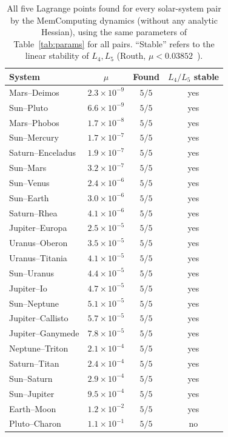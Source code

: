 \documentclass[aip,preprint,amsmath,amssymb,floatfix]{revtex4-2}
\begin{document}
\begin{table}[t]
\centering
\caption{All five Lagrange points found for every solar-system pair by the
MemComputing dynamics (without any analytic Hessian), using the same 
parameters of Table~\ref{tab:params} for all pairs. ``Stable'' refers to the linear stability
of $L_4,L_5$ (Routh, $\mu<0.03852$~\cite{routh1875}).}
\label{tab:systems}
\begin{tabular}{lccc}
\toprule
System & $\mu$ & Found & $L_4/L_5$ stable\\
\midrule
Mars--Deimos      & $2.3\times10^{-9}$ & $5/5$ & yes\\
Sun--Pluto        & $6.6\times10^{-9}$ & $5/5$ & yes\\
Mars--Phobos      & $1.7\times10^{-8}$ & $5/5$ & yes\\
Sun--Mercury      & $1.7\times10^{-7}$ & $5/5$ & yes\\
Saturn--Enceladus & $1.9\times10^{-7}$ & $5/5$ & yes\\
Sun--Mars         & $3.2\times10^{-7}$ & $5/5$ & yes\\
Sun--Venus        & $2.4\times10^{-6}$ & $5/5$ & yes\\
Sun--Earth        & $3.0\times10^{-6}$ & $5/5$ & yes\\
Saturn--Rhea      & $4.1\times10^{-6}$ & $5/5$ & yes\\
Jupiter--Europa   & $2.5\times10^{-5}$ & $5/5$ & yes\\
Uranus--Oberon    & $3.5\times10^{-5}$ & $5/5$ & yes\\
Uranus--Titania   & $4.1\times10^{-5}$ & $5/5$ & yes\\
Sun--Uranus       & $4.4\times10^{-5}$ & $5/5$ & yes\\
Jupiter--Io       & $4.7\times10^{-5}$ & $5/5$ & yes\\
Sun--Neptune      & $5.1\times10^{-5}$ & $5/5$ & yes\\
Jupiter--Callisto & $5.7\times10^{-5}$ & $5/5$ & yes\\
Jupiter--Ganymede & $7.8\times10^{-5}$ & $5/5$ & yes\\
Neptune--Triton   & $2.1\times10^{-4}$ & $5/5$ & yes\\
Saturn--Titan     & $2.4\times10^{-4}$ & $5/5$ & yes\\
Sun--Saturn       & $2.9\times10^{-4}$ & $5/5$ & yes\\
Sun--Jupiter      & $9.5\times10^{-4}$ & $5/5$ & yes\\
Earth--Moon       & $1.2\times10^{-2}$ & $5/5$ & yes\\
Pluto--Charon     & $1.1\times10^{-1}$ & $5/5$ & no\\
\bottomrule
\end{tabular}
\end{table}
\end{document}
